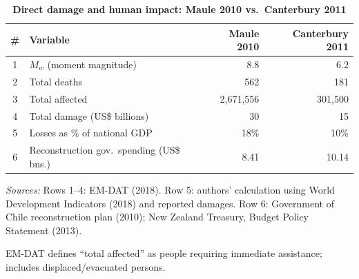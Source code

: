 \documentclass[12pt]{article}
\begin{document}
\begin{table}[H]
\centering
\caption{\textbf{Direct damage and human impact: Maule 2010 vs.\ Canterbury 2011}}
\label{tab:damage_compare}
\small
\setlength{\tabcolsep}{6pt}
\begin{threeparttable}
\begin{tabular}{clrr}
\toprule
\# & \textbf{Variable} & \textbf{Maule 2010} & \textbf{Canterbury 2011} \\
\midrule
1 & $M_w$ (moment magnitude)                 & 8.8        & 6.2 \\
2 & Total deaths                              & 562        & 181 \\
3 & Total affected\tnote{a}                   & 2,671,556  & 301,500 \\
4 & Total damage (US\$ billions)              & 30         & 15 \\
5 & Losses as \% of national GDP              & 18\%       & 10\% \\
6 & Reconstruction gov.\ spending (US\$ bns.) & 8.41       & 10.14 \\
\bottomrule
\end{tabular}
\begin{tablenotes}[flushleft]\footnotesize
\item \textit{Sources:} Rows 1--4: EM-DAT (2018). Row 5: authors’ calculation using World Development Indicators (2018) and reported damages. Row 6: Government of Chile reconstruction plan (2010); New Zealand Treasury, Budget Policy Statement (2013).
\item[a] EM-DAT defines “total affected” as people requiring immediate assistance; includes displaced/evacuated persons.
\end{tablenotes}
\end{threeparttable}
\end{table}
\end{document}
